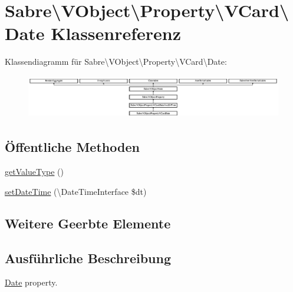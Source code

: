 \hypertarget{class_sabre_1_1_v_object_1_1_property_1_1_v_card_1_1_date}{}\section{Sabre\textbackslash{}V\+Object\textbackslash{}Property\textbackslash{}V\+Card\textbackslash{}Date Klassenreferenz}
\label{class_sabre_1_1_v_object_1_1_property_1_1_v_card_1_1_date}
Klassendiagramm für Sabre\textbackslash{}V\+Object\textbackslash{}Property\textbackslash{}V\+Card\textbackslash{}Date\+:\begin{figure}[H]
\begin{center}
\leavevmode
\includegraphics[height=1.917808cm]{class_sabre_1_1_v_object_1_1_property_1_1_v_card_1_1_date}
\end{center}
\end{figure}
\subsection*{Öffentliche Methoden}
\begin{DoxyCompactItemize}
\item 
\mbox{\hyperlink{class_sabre_1_1_v_object_1_1_property_1_1_v_card_1_1_date_acd0e0c5270cd5e24967720007009d1fc}{get\+Value\+Type}} ()
\item 
\mbox{\hyperlink{class_sabre_1_1_v_object_1_1_property_1_1_v_card_1_1_date_a2275aab00ec7ab4662e1e11d72c43878}{set\+Date\+Time}} (\textbackslash{}Date\+Time\+Interface \$dt)
\end{DoxyCompactItemize}
\subsection*{Weitere Geerbte Elemente}


\subsection{Ausführliche Beschreibung}
\mbox{\hyperlink{class_sabre_1_1_v_object_1_1_property_1_1_v_card_1_1_date}{Date}} property.

